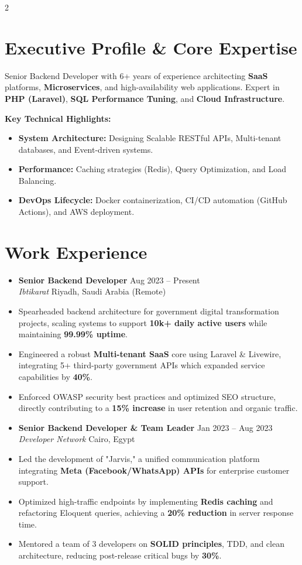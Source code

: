 \documentclass[10pt, a4paper]{article}
\newcommand{\resumeItem}[1]{
  \item\small{
    {#1 \vspace{3pt}} %
  }
}
\newcommand{\resumeSubheading}[4]{
  \vspace{10pt} %
  \item
    \textbf{#1} \hfill {\footnotesize #2} \\ 
    \textit{\small #3} \hfill {\footnotesize #4} \\
    \vspace{4pt}
}
\begin{document}
\begin{paracol}{2}


\section{Executive Profile \& Core Expertise}
Senior Backend Developer with 6+ years of experience architecting \textbf{SaaS} platforms, \textbf{Microservices}, and high-availability web applications. Expert in \textbf{PHP (Laravel)}, \textbf{SQL Performance Tuning}, and \textbf{Cloud Infrastructure}.

\vspace{5pt}
\textbf{Key Technical Highlights:}
\begin{itemize}[leftmargin=0.2in, itemsep=2pt]
    \item \textbf{System Architecture:} Designing Scalable RESTful APIs, Multi-tenant databases, and Event-driven systems.
    \item \textbf{Performance:} Caching strategies (Redis), Query Optimization, and Load Balancing.
    \item \textbf{DevOps Lifecycle:} Docker containerization, CI/CD automation (GitHub Actions), and AWS deployment.
\end{itemize}

\section{Work Experience}
\begin{itemize}[leftmargin=0.15in, label={}]

    \resumeSubheading
      {Senior Backend Developer}{Aug 2023 -- Present}
      {Ibtikarat}{Riyadh, Saudi Arabia (Remote)}
      \resumeItem{Spearheaded backend architecture for government digital transformation projects, scaling systems to support \textbf{10k+ daily active users} while maintaining \textbf{99.99\% uptime}.}
      \resumeItem{Engineered a robust \textbf{Multi-tenant SaaS} core using Laravel \& Livewire, integrating 5+ third-party government APIs which expanded service capabilities by \textbf{40\%}.}
      \resumeItem{Enforced OWASP security best practices and optimized SEO structure, directly contributing to a \textbf{15\% increase} in user retention and organic traffic.}

    \resumeSubheading
      {Senior Backend Developer \& Team Leader}{Jan 2023 -- Aug 2023}
      {Developer Network}{Cairo, Egypt}
      \resumeItem{Led the development of "Jarvis," a unified communication platform integrating \textbf{Meta (Facebook/WhatsApp) APIs} for enterprise customer support.}
      \resumeItem{Optimized high-traffic endpoints by implementing \textbf{Redis caching} and refactoring Eloquent queries, achieving a \textbf{20\% reduction} in server response time.}
      \resumeItem{Mentored a team of 3 developers on \textbf{SOLID principles}, TDD, and clean architecture, reducing post-release critical bugs by \textbf{30\%}.}


\end{itemize}
\end{paracol}
\end{document}
